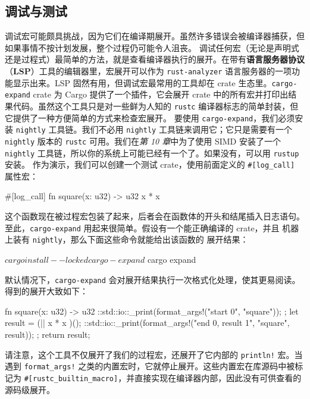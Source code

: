 \subsection{调试与测试}
\label{idx:idx_b575563c}
调试宏可能颇具挑战，因为它们在编译期展开。虽然许多错误会被编译器捕获，但如果事情不按计划发展，整个过程仍可能令人沮丧。
\label{idx:idx_205502ab}
\label{idx:idx_4b4b64a6}
调试任何宏（无论是声明式还是过程式）最简单的方法，就是查看编译器执行的展开。在带有\textbf{语言服务器协议}（\textbf{LSP}）工具的编辑器里，宏展开可以作为 \texttt{rust-\allowbreak{}analyzer} 语言服务器的一项功能显示出来。LSP 固然有用，但调试宏最常用的工具却在 crate 生态里。\texttt{cargo-\allowbreak{}expand} crate 为 Cargo 提供了一个插件，它会展开 crate 中的所有宏并打印出结果代码。虽然这个工具只是对一些鲜为人知的
\texttt{rustc} 编译器标志的简单封装，但它提供了一种方便简单的方式来检查宏展开。
要使用 \texttt{cargo-\allowbreak{}expand}，我们必须安装 \texttt{nightly} 工具链。我们不必用 \texttt{nightly} 工具链来调用它；它只是需要有一个 \texttt{nightly} 版本的 \texttt{rustc} 可用。我们在\emph{第 10 章}中为了使用 SIMD 安装了一个 \texttt{nightly} 工具链，所以你的系统上可能已经有一个了。如果没有，可以用 \texttt{rustup} 安装。
作为演示，我们可以创建一个测试 crate，使用前面定义的 \texttt{\#[\allowbreak{}log\_\allowbreak{}call]\allowbreak{}} 属性宏：
\begin{codebox}[rust]
#[log_call]
fn square(x: u32) -> u32 {
    x * x
}
\end{codebox}
\label{idx:idx_e340ffad}
\label{idx:idx_00530ed1}
这个函数现在被过程宏包装了起来，后者会在函数体的开头和结尾插入日志语句。
至此，\texttt{cargo-\allowbreak{}expand} 用起来很简单。假设有一个能正确编译的 crate，并且
机器上装有 \texttt{nightly}，那么下面这些命令就能给出该函数的
展开结果：
\begin{codeboxdark}
$ cargo install --locked cargo-expand
$ cargo expand
\end{codeboxdark}
默认情况下，\texttt{cargo-\allowbreak{}expand} 会对展开结果执行一次格式化处理，使其更易阅读。得到的展开大致如下：
\begin{codebox}[rust]
fn square(x: u32) -> u32 {
    {
        ::std::io::_print(format_args!("start {0}\n", "square"));
    };
    let result = (|| { x * x })();
    {
        ::std::io::_print(format_args!("end {0}, result {1}\n", "square",
result));
    };
    return result;
}
\end{codebox}
请注意，这个工具不仅展开了我们的过程宏，还展开了它内部的 \texttt{println!} 宏。当遇到 \texttt{format\_\allowbreak{}args!} 之类的内置宏时，它就停止展开。这些内置宏在库源码中被标记为 \texttt{\#[\allowbreak{}rustc\_\allowbreak{}builtin\_\allowbreak{}macro]\allowbreak{}}，并直接实现在编译器内部，因此没有可供查看的源码级展开。
